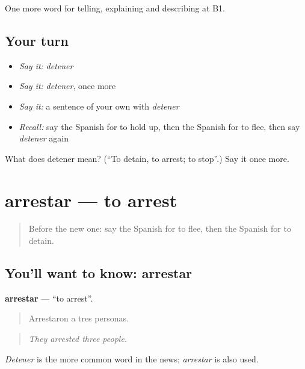 \begin{grammarlens}[title={What you've built}]
One more word for telling, explaining and describing at B1.
\end{grammarlens}

\subsection*{Your turn}
\begin{itemize}
\raggedright
  \item \emph{Say it:} \emph{detener}
  \item \emph{Say it:} \emph{detener}, once more
  \item \emph{Say it:} a sentence of your own with \emph{detener}
  \item \emph{Recall:} say the Spanish for to hold up, then the Spanish for to flee, then say \emph{detener} again
\end{itemize}

\begin{tcolorbox}[breakable,colback=teal!4,colframe=teal!35!black,title={Before you move on}]
What does detener mean? (\textquotedblleft{}To detain, to arrest; to stop\textquotedblright{}.) Say it once more.
\end{tcolorbox}
\section[arrestar]{arrestar — to arrest}

\label{lesson:ES-C519-arrestar}



\begin{quote}
Before the new one: say the Spanish for to flee, then the Spanish for to detain.
\end{quote}

\subsection*{You'll want to know: arrestar}
\textbf{arrestar} — \textquotedblleft{}to arrest\textquotedblright{}.

\begin{quote}
Arrestaron a tres personas.
\end{quote}

\begin{quote}
\emph{They arrested three people.}
\end{quote}

\emph{Detener} is the more common word in the news; \emph{arrestar} is also used.

